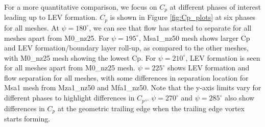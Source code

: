 For a more quantitative comparison, we focus on $C_p$  at different phases of interest leading up to LEV formation. $C_p$ is shown in Figure \ref{fig:Cp_plots} at six phases for all meshes. At $\psi=180^\circ$, we can see that flow has started to separate for all meshes apart from M0\_nz25. For $\psi=195^\circ$, Msa1\_nz50 mesh shows larger Cp and LEV formation/boundary layer roll-up, as compared to the other meshes, with M0\_nz25 mesh showing the lowest Cp. For $\psi=210^\circ$, LEV formation is seen for all meshes apart from M0\_nz25 mesh. $\psi=225^\circ$ shows LEV formation and flow separation for all meshes, with some differences in separation location for Msa1 mesh from Mza1\_nz50 and Mfa1\_nz50. Note that the y-axis limits vary for different phases to highlight differences in $C_p$,.
$\psi=270^\circ$ and $\psi=285^\circ$ also show differences in $C_p$ at the geometric trailing edge when the trailing edge vortex starts forming. 


